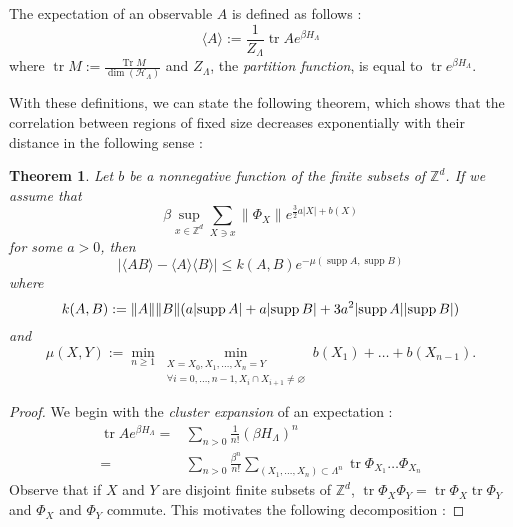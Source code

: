 \documentclass[french]{article}
\DeclarePairedDelimiter\abs{\lvert}{\rvert}
\newtheorem{thm}{Theorem}
\DeclareMathOperator{\Tr}{Tr}
\DeclareMathOperator{\tr}{tr}
\DeclareMathOperator{\supp}{supp}
\begin{document}
 The expectation of an observable $A$ is defined as follows :
 $$
 \langle A \rangle := \frac{1}{Z_\Lambda}\tr Ae^{\beta H_\Lambda}
 $$
 where $\tr M:=\frac{\Tr M}{\dim(\mathcal H_\Lambda)}$ and $Z_\Lambda$, the {\it partition function}, is equal to $\tr e^{\beta H_\Lambda}$.
 
 With these definitions, we can state the following theorem, which shows that the correlation between regions of fixed size decreases exponentially with their distance in the following sense :
 \begin{thm}
     Let $b$ be a nonnegative function of the finite subsets of $\mathbb Z^d$.
     If we assume that 
     $$\beta\sup_{x\in\mathbb Z^d}\sum_{X\ni x}\lVert\Phi_X\rVert e^{\frac{3}{2}a|X|+b(X)}$$ 
     for some $a>0$, then 
     $$|\langle AB\rangle - \langle A\rangle\langle B\rangle|\leq k(A,B)e^{-\mu(\supp A,\supp B)}$$
     where $$k(A,B):=\lVert A\rVert\lVert B\rVert(a\abs{\supp A}+a\abs{\supp B} + 3a^2\abs{\supp A}\abs{\supp B})$$ and 
     $$
     \mu(X,Y):= \min_{n\geq 1} \min_{\substack{X=X_0,X_1,\ldots,X_n=Y \\ \forall i=0,\ldots,n-1, X_i\cap X_{i+1}\neq \varnothing}} b(X_1)+\ldots+b(X_{n-1}).
     $$
 \end{thm}
 \begin{proof}
     We begin with the {\it cluster expansion} of an expectation :
     \begin{align*}
         \tr Ae^{\beta H_\Lambda}=&\sum_{n>0}\frac{1}{n!}(\beta H_\Lambda)^n\\
         =&\sum_{n>0}\frac{\beta^n}{n!}\sum_{(X_1,\ldots, X_n)\subset \Lambda^n}\tr\Phi_{X_1}\ldots\Phi_{X_n}
     \end{align*}
     Observe that if $X$ and $Y$ are disjoint finite subsets of $\mathbb Z^d$, $\tr \Phi_X\Phi_Y=\tr \Phi_X \tr\Phi_Y$ and $\Phi_X$ and $\Phi_Y$ commute.
     This motivates the following decomposition :
     
 \end{proof}
 
 
 
 \printbibliography
\end{document}
